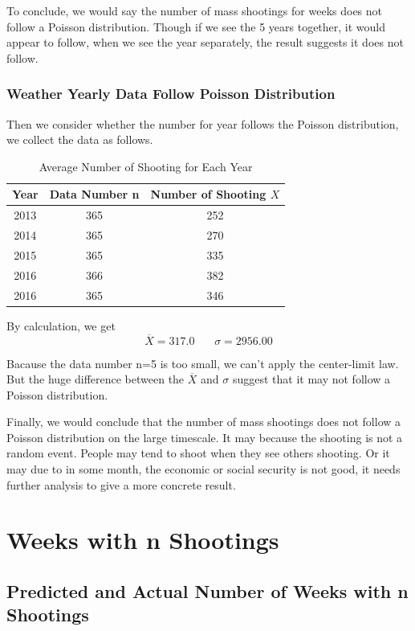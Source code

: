 \documentclass{article}
\begin{document}
To conclude, we would say the number of mass shootings for weeks does not follow a Poisson distribution. Though if we see the 5 years together, it would appear to follow, when we see the year separately, the result suggests it does not follow.


\subsubsection{Weather Yearly Data Follow Poisson Distribution}

Then we consider whether the number for year follows the Poisson distribution, we collect the data as follows.

\begin{table} [!htbp]
\begin{center}
\begin{tabular*} {14cm} {@{\extracolsep{\fill} }ccc} 
\toprule
Year & Data Number n & Number of Shooting $ X$ \\
\midrule
2013	&	365 & 252	\\
2014	&	365   &	270 \\
2015	&	365 & 335	\\
2016	&	366   &	382 \\
2016	&	365 & 346	\\
\bottomrule
\end{tabular*} 
\end{center}
\caption{Average Number of Shooting for Each Year }
\end{table} 

By calculation, we get
$$\overline X=317.0\ \ \ \ \ \ \  \ \sigma=2956.00$$


Bacause the data number n=5 is too small, we can't apply the center-limit law. But the huge difference between the $\overline X$ and $\sigma$ suggest that it may not follow a Poisson distribution.

Finally, we would conclude that the number of mass shootings does not follow a Poisson distribution on the large timescale. It may because the shooting is not a random event. People may tend to shoot when they see others shooting. Or it may due to in some month, the economic or social security is not good, it needs further analysis to give a more concrete result.

\section{Weeks with n Shootings}


\subsection{Predicted and Actual Number of Weeks with n Shootings}
\end{document}
